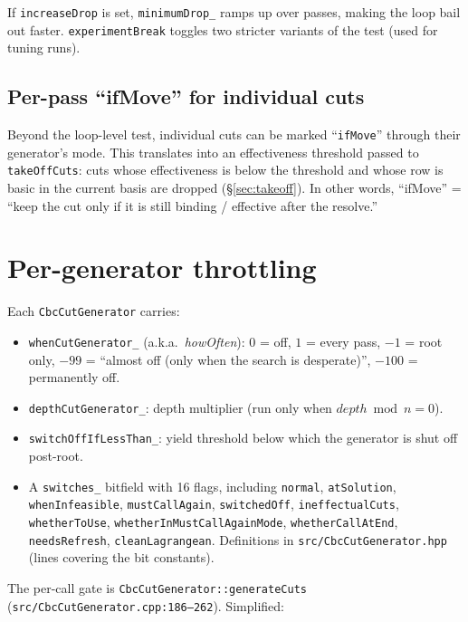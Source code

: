 \documentclass[11pt,a4paper]{article}
\begin{document}
If \texttt{increaseDrop} is set, \texttt{minimumDrop\_} ramps up over
passes, making the loop bail out faster.  \texttt{experimentBreak}
toggles two stricter variants of the test (used for tuning runs).

\subsection*{Per-pass ``ifMove'' for individual cuts}

Beyond the loop-level test, individual cuts can be marked
``\texttt{ifMove}'' through their generator's mode.  This translates
into an effectiveness threshold passed to \texttt{takeOffCuts}: cuts
whose effectiveness is below the threshold and whose row is basic in
the current basis are dropped (\S\ref{sec:takeoff}).  In other
words, ``ifMove'' = ``keep the cut only if it is still binding /
effective after the resolve.''

\section{Per-generator throttling}
\label{sec:howoften}

Each \texttt{CbcCutGenerator} carries:
\begin{itemize}[leftmargin=*]
  \item \texttt{whenCutGenerator\_} (a.k.a.\ \emph{howOften}):
        $0$ = off, $1$ = every pass, $-1$ = root only,
        $-99$ = ``almost off (only when the search is desperate)'',
        $-100$ = permanently off.
  \item \texttt{depthCutGenerator\_}: depth multiplier
        (run only when $depth \bmod n=0$).
  \item \texttt{switchOffIfLessThan\_}: yield threshold below which
        the generator is shut off post-root.
  \item A \texttt{switches\_} bitfield with 16 flags, including
        \texttt{normal}, \texttt{atSolution}, \texttt{whenInfeasible},
        \texttt{mustCallAgain}, \texttt{switchedOff},
        \texttt{ineffectualCuts}, \texttt{whetherToUse},
        \texttt{whetherInMustCallAgainMode},
        \texttt{whetherCallAtEnd}, \texttt{needsRefresh},
        \texttt{cleanLagrangean}.  Definitions in
        \texttt{src/CbcCutGenerator.hpp} (lines covering the bit
        constants).
\end{itemize}

The per-call gate is \texttt{CbcCutGenerator::generateCuts}
(\texttt{src/CbcCutGenerator.cpp:186--262}).  Simplified:
\end{document}
